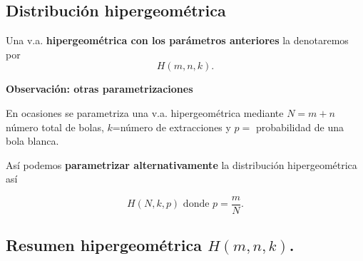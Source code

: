 \documentclass[]{book}
\begin{document}
\hypertarget{distribuciuxf3n-hipergeomuxe9trica-1}{%
\subsection{Distribución hipergeométrica}\label{distribuciuxf3n-hipergeomuxe9trica-1}}

Una v.a. \textbf{hipergeométrica con los parámetros anteriores} la
denotaremos por
\[H(m,n,k).\]

 \textbf{Observación: otras parametrizaciones}

En ocasiones se parametriza una v.a. hipergeométrica mediante \(N=m+n\) número total de bolas,
\(k\)=número de extracciones y \(p=\) probabilidad de una bola blanca.

Así podemos \textbf{parametrizar alternativamente} la distribución hipergeométrica así

\[H(N,k,p)\mbox{ donde } p=\frac{m}{N}.\]

\hypertarget{resumen-hipergeomuxe9trica-hmnk.}{%
\subsection{\texorpdfstring{Resumen hipergeométrica \(H(m,n,k)\).}{Resumen hipergeométrica H(m,n,k).}}\label{resumen-hipergeomuxe9trica-hmnk.}}
\end{document}
